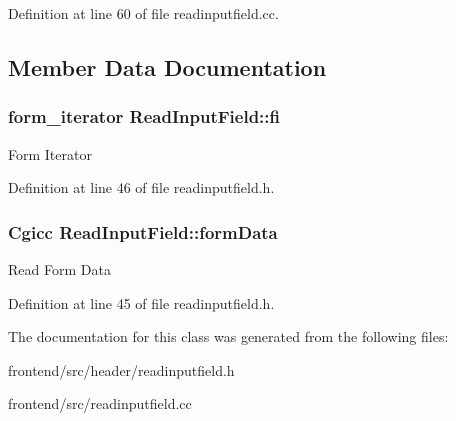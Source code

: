 Definition at line 60 of file readinputfield.\-cc.



\subsection{Member Data Documentation}
\hypertarget{classReadInputField_ae252dc321be04c2c1afa6928ad16a45d}{
\subsubsection[{fi}]{\setlength{\rightskip}{0pt plus 5cm}form\-\_\-iterator Read\-Input\-Field\-::fi\hspace{0.3cm}{\ttfamily [protected]}}}\label{classReadInputField_ae252dc321be04c2c1afa6928ad16a45d}
Form Iterator 

Definition at line 46 of file readinputfield.\-h.

\hypertarget{classReadInputField_a1e4ebac8979fd9b2771320d669fce5fc}{
\subsubsection[{form\-Data}]{\setlength{\rightskip}{0pt plus 5cm}Cgicc Read\-Input\-Field\-::form\-Data\hspace{0.3cm}{\ttfamily [protected]}}}\label{classReadInputField_a1e4ebac8979fd9b2771320d669fce5fc}
Read Form Data 

Definition at line 45 of file readinputfield.\-h.



The documentation for this class was generated from the following files\-:\begin{DoxyCompactItemize}
\item 
frontend/src/header/readinputfield.\-h\item 
frontend/src/readinputfield.\-cc\end{DoxyCompactItemize}
